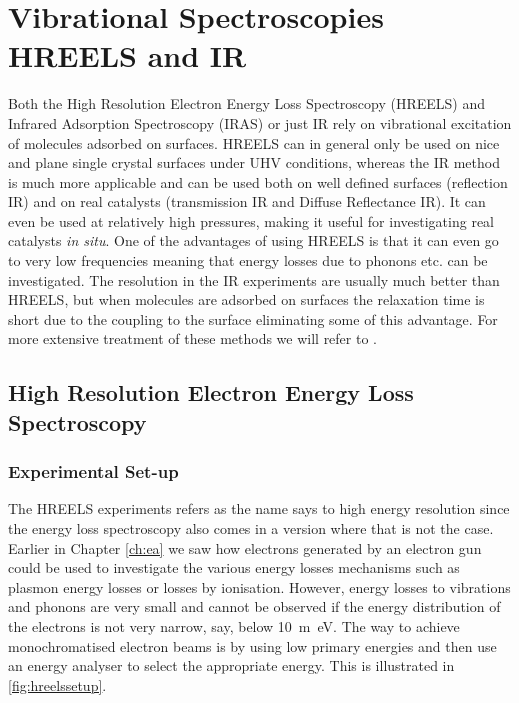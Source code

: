 \chapter{Vibrational Spectroscopies HREELS and IR}
Both the High Resolution Electron Energy Loss Spectroscopy (HREELS) and Infrared Adsorption Spectroscopy (IRAS) or just IR  rely on vibrational excitation of molecules adsorbed on surfaces. HREELS can in general only be used on nice and plane single crystal surfaces under UHV conditions, whereas the IR method is much more applicable and can be used both on well defined surfaces (reflection IR) and on real catalysts (transmission IR and Diffuse Reflectance IR). It can even be used at relatively high pressures, making it useful for investigating real catalysts {\it in situ}. One of the advantages of using HREELS is that it can even go to very low frequencies meaning that energy losses due to phonons etc. can be investigated. The resolution in the IR experiments are usually much better than HREELS, but when molecules are adsorbed on surfaces the relaxation time is short due to the coupling  to the surface eliminating some of this advantage. For more extensive treatment of these methods we will refer to \cite{Ibach,Ertl,Zangwill}.

\section{High Resolution Electron Energy Loss Spectroscopy}
\subsection{Experimental Set-up}
The HREELS experiments refers as the name says to high energy resolution since the energy loss spectroscopy also comes in a version where that is not the case. Earlier in Chapter \ref{ch:ea} we saw how electrons generated by an electron gun could be used to investigate the various energy losses mechanisms such as plasmon energy losses or losses by ionisation. However, energy losses to vibrations and phonons are very small and cannot be observed if the energy distribution of the electrons is not very narrow, say, below \SI{10}{m\electronvolt}. The way to achieve monochromatised electron beams is by using low primary energies and then use an energy analyser to select the appropriate energy. This is illustrated in \autoref{fig:hreelssetup}.

